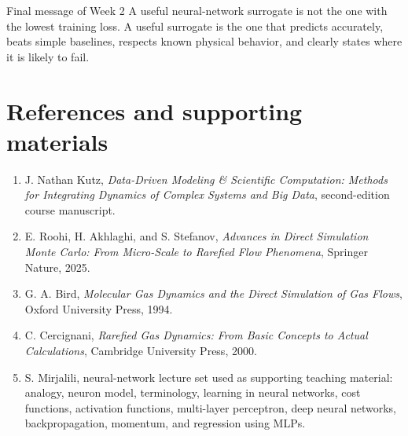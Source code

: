 \documentclass[11pt]{article}
\begin{document}
\begin{keybox}{Final message of Week 2}
A useful neural-network surrogate is not the one with the lowest training loss.  A useful surrogate is the one that predicts accurately, beats simple baselines, respects known physical behavior, and clearly states where it is likely to fail.
\end{keybox}

\section*{References and supporting materials}
\begin{enumerate}
    \item J. Nathan Kutz, \emph{Data-Driven Modeling \& Scientific Computation: Methods for Integrating Dynamics of Complex Systems and Big Data}, second-edition course manuscript.
    \item E. Roohi, H. Akhlaghi, and S. Stefanov, \emph{Advances in Direct Simulation Monte Carlo: From Micro-Scale to Rarefied Flow Phenomena}, Springer Nature, 2025.
    \item G. A. Bird, \emph{Molecular Gas Dynamics and the Direct Simulation of Gas Flows}, Oxford University Press, 1994.
    \item C. Cercignani, \emph{Rarefied Gas Dynamics: From Basic Concepts to Actual Calculations}, Cambridge University Press, 2000.
    \item S. Mirjalili, neural-network lecture set used as supporting teaching material: analogy, neuron model, terminology, learning in neural networks, cost functions, activation functions, multi-layer perceptron, deep neural networks, backpropagation, momentum, and regression using MLPs.
\end{enumerate}
\end{document}
